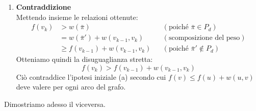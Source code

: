\begin{enumerate}
    \[f(v_{k-1}) = f(\text{tail}(\bar{\pi}')) \leq w(\bar{\pi}')\]

    \item \textbf{Contraddizione} \\
    Mettendo insieme le relazioni ottenute:
    \begin{align*}
        f(v_k) &> w(\bar{\pi}) && (\text{poiché } \bar{\pi} \in P_d) \\
               &= w(\bar{\pi}') + w(v_{k-1}, v_k) && (\text{scomposizione del peso}) \\
               &\geq f(v_{k-1}) + w(v_{k-1}, v_k) && (\text{poiché } \bar{\pi}' \notin P_d)
    \end{align*}
    Otteniamo quindi la disuguaglianza stretta:
    \[f(v_k) > f(v_{k-1}) + w(v_{k-1}, v_k)\]
    Ciò contraddice l'ipotesi iniziale (a) secondo cui $f(v) \leq f(u) + w(u,v)$ deve valere per ogni arco del grafo.
\end{enumerate}
Dimostriamo adesso il viceversa.
